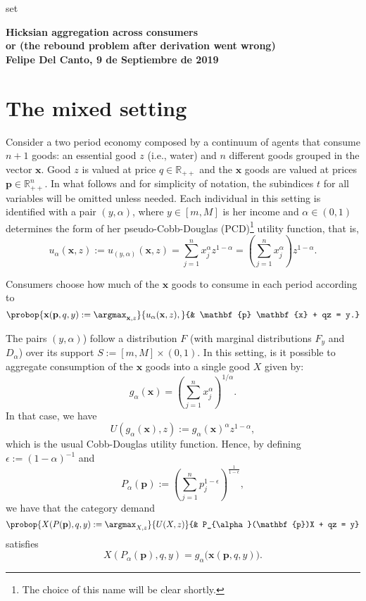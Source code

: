 set\documentclass[english, a4paper,12pt]{article}
\begin{document}
\begin{center} \bf \large
	Hicksian aggregation across consumers \\ or (the rebound problem after derivation went wrong) \\ Felipe Del Canto, 9 de Septiembre de 2019
\end{center}

\section{The mixed setting}
Consider a two period economy composed by a continuum of agents that consume $n+1$ goods: an essential good $z$ (i.e., water) and $n$ different goods grouped in the vector $\mathbf{x}$. Good $z$ is valued at price $q \in \mathbb{R}_{++}$ and the $\mathbf{x}$ goods are valued at prices $\mathbf{p} \in \mathbb{R}^{n}_{++}$.  In what follows and for simplicity of notation, the subindices $t$ for all variables will be omitted unless needed. Each individual in this setting is identified with a pair $(y,\alpha)$, where $y \in [m,M]$ is her income and $\alpha \in (0,1)$ determines the form of her pseudo-Cobb-Douglas (PCD)\footnote{The choice of this name will be clear shortly.} utility function, that is,
	$$u_{\alpha}(\mathbf{x},z) := u_{(y,\alpha)}(\mathbf{x},z) = \sum_{j=1}^{n} x_{j}^{\alpha}z^{1-\alpha} = \left(\sum_{j=1}^{n} x_{j}^{\alpha}\right)z^{1-\alpha}.$$

Consumers choose how much of the $\mathbf{x}$ goods to consume in each period according to
	\begin{equation} \label{eq:probdisagg}
		\probop{\mathbf{x}(\mathbf{p}, q, y) 
			:= \argmax_{\mathbf{x}, z}}{u_{\alpha}(\mathbf{x}, z),}
				{&	\mathbf{p} \mathbf{x} + qz = y.}
	\end{equation} 

The pairs $(y,\alpha)$) follow a distribution $F$ (with marginal distributions $F_{y}$ and $D_{\alpha}$) over its support $S := [m,M] \times  (0,1)$. In this setting, is it possible to aggregate consumption of the $\mathbf{x}$ goods into a single good $X$ given by: 
	$$g_{\alpha}(\mathbf{x}) = \left(\sum_{j=1}^{n} x_{j}^{\alpha}\right)^{1/\alpha}.$$
In that case, we have
	$$U(g_{\alpha}(\mathbf{x}), z) := g_{\alpha}(\mathbf{x})^{\alpha}z^{1-\alpha},$$
which is the usual Cobb-Douglas utility function. Hence, by defining $\epsilon := (1-\alpha)^{-1}$ and
	$$P_{\alpha}(\mathbf{p}) :=  \left( \sum_{j=1}^{n} p_{j}^{1-\epsilon} \right)^{\frac{1}{1-\epsilon}},$$
we have that the category demand
	\begin{equation} \label{eq:probagg}
		\probop{X(P(\mathbf{p}), q, y) := \argmax_{X, z}}{U(X,z)}
										{&	P_{\alpha}(\mathbf{p})X + qz = y}
	\end{equation}
satisfies
	\begin{equation} \label{eq:aggequality}
		X(P_{\alpha}(\mathbf{p}), q, y) = g_{\alpha}\big(\mathbf{x}(\mathbf{p}, q, y)\big).
	\end{equation}
\end{document}
